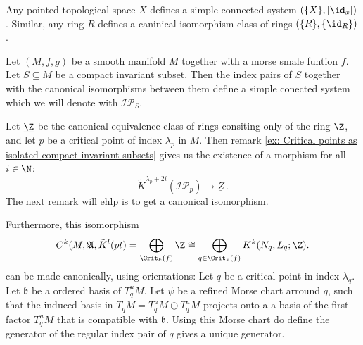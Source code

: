 \begin{example}
	Any pointed topological space $X$ defines a simple connected system $(\{X\},{[\id_x]})$. Similar, any ring $R$ defines a caninical isomorphism class of rings $(\{R\},\{\id_R\})$.
\end{example}
\begin{definition}
	Let $(M,f,g)$ be a smooth manifold $M$ together with a morse smale funtion $f$. Let $S\subseteq M$ be a compact invariant subset. Then the index pairs of $S$ together with the canonical isomorphisms between them define a simple conected system which we will denote with $\mathcal{IP}_S$.   
\end{definition}
\begin{remark}
	Let $\underline{\Z}$ be the canonical equivalence class of rings consiting only of the ring $\Z$, and let $p$ be a critical point of index $\lambda_p$ in $M$. Then remark \ref{ex: Critical points as isolated compact invariant subsets} gives us the existence of a morphism for all $i\in \N$:
	\begin{equation*}
		\tilde{K}^{\lambda_p+2i}(\mathcal{IP}_p)\to \underline{Z}\,.
	\end{equation*} The next remark will ehlp is to get a canonical isomorphism.
\end{remark}
\begin{remark}
	Furthermore, this isomorphism 
	\begin{equation} \label{ kritical points as direct sum of homology groups}
		C^{k}(M,\mathfrak{A},\tilde{K}^{l}(pt)=\bigoplus_{ \Crit_k(f)} \Z \cong \bigoplus_{q\in \Crit_k(f)} K^k(N_q,L_q;\Z).
	\end{equation}
	can be made canonically, using orientations: Let $q$ be a critical point in index $\lambda_q$. Let $\mathfrak{b}$ be a ordered basis of $T^u_qM$. Let $\psi$ be a refined Morse chart arround $q$, such that the induced basis in $T_qM=T^u_qM\oplus T^u_qM$ projects onto a a basis of the first factor $T^u_qM$ that is compatible with $\mathfrak{b}$. Using this Morse chart do define the generator of the regular index pair of $q$ gives a unique generator.
\end{remark}
